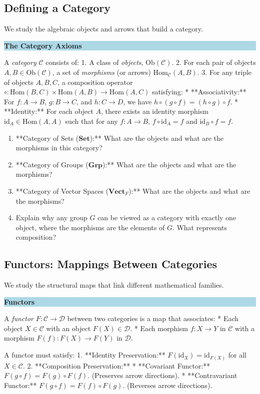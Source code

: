 \documentclass[12pt, a4paper]{article}
\newenvironment{namedconcept}[1]
  {\par\medskip\fillcolorbox{LightBlue}{NavyBlue}{#1}}
  {\par\medskip}
\newcommand{\fillcolorbox}[3]{%
  \noindent
  \filldrawbox{#1}{#2}{\textbf{\sffamily\color{white}#3}}\par\nobreak\vspace{4pt}
}
\newcommand{\filldrawbox}[3]{%
  \colorbox{#1}{\parbox{\dimexpr\linewidth-2\fboxsep\relax}{%
    \vspace{4pt}\noindent\hspace{4pt}#3\vspace{4pt}%
  }}%
}
\newcommand{\newterm}[1]{\textit{\textcolor{DiscoveryColor}{#1}}}
\begin{document}
\subsection{Defining a Category}

We study the algebraic objects and arrows that build a category.

\begin{namedconcept}{The Category Axioms}
A \newterm{category} $\mathcal{C}$ consists of:
1. A class of \newterm{objects}, $\text{Ob}(\mathcal{C})$.
2. For each pair of objects $A, B \in \text{Ob}(\mathcal{C})$, a set of \newterm{morphisms} (or arrows) $\text{Hom}_{\mathcal{C}}(A, B)$.
3. For any triple of objects $A, B, C$, a composition operator $\circ: \text{Hom}(B, C) \times \text{Hom}(A, B) \to \text{Hom}(A, C)$ satisfying:
   * **Associativity:** For $f: A \to B$, $g: B \to C$, and $h: C \to D$, we have $h \circ (g \circ f) = (h \circ g) \circ f$.
   * **Identity:** For each object $A$, there exists an identity morphism $\text{id}_A \in \text{Hom}(A, A)$ such that for any $f: A \to B$, $f \circ \text{id}_A = f$ and $\text{id}_B \circ f = f$.
\end{namedconcept}

\begin{enumerate}[label=(\alph*), leftmargin=*]
  \item **Category of Sets ($\mathbf{Set}$):** What are the objects and what are the morphisms in this category?
  \item **Category of Groups ($\mathbf{Grp}$):** What are the objects and what are the morphisms?
  \item **Category of Vector Spaces ($\mathbf{Vect}_F$):** What are the objects and what are the morphisms?
  \item Explain why any group $G$ can be viewed as a category with exactly one object, where the morphisms are the elements of $G$. What represents composition?
\end{enumerate}

\subsection{Functors: Mappings Between Categories}

We study the structural maps that link different mathematical families.

\begin{namedconcept}{Functors}
A \newterm{functor} $F: \mathcal{C} \to \mathcal{D}$ between two categories is a map that associates:
* Each object $X \in \mathcal{C}$ with an object $F(X) \in \mathcal{D}$.
* Each morphism $f: X \to Y$ in $\mathcal{C}$ with a morphism $F(f): F(X) \to F(Y)$ in $\mathcal{D}$.

A functor must satisfy:
1. **Identity Preservation:** $F(\text{id}_X) = \text{id}_{F(X)}$ for all $X \in \mathcal{C}$.
2. **Composition Preservation:**
   * **Covariant Functor:** $F(g \circ f) = F(g) \circ F(f)$. (Preserves arrow directions).
   * **Contravariant Functor:** $F(g \circ f) = F(f) \circ F(g)$. (Reverses arrow directions).
\end{namedconcept}
\end{document}
